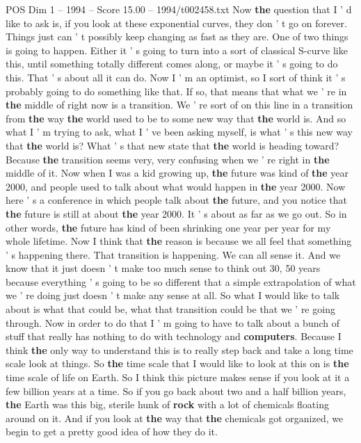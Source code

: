 \begin{textsample}{POS Dim 1 – 1994 – Score 15.00 – 1994/t002458.txt}
Now \textbf{the} question that I ' d like to ask is, if you look at these exponential curves, they don ' t go on forever.
Things just can ' t possibly keep changing as fast as they are.
One of two things is going to happen.
Either it ' s going to turn into a sort of classical S-curve like this, until something totally different comes along, or maybe it ' s going to do this.
That ' s about all it can do.
Now I ' m an optimist, so I sort of think it ' s probably going to do something like that.
If so, that means that what we ' re in \textbf{the} middle of right now is a transition.
We ' re sort of on this line in a transition from \textbf{the} way \textbf{the} world used to be to some new way that \textbf{the} world is.
And so what I ' m trying to ask, what I ' ve been asking myself, is what ' s this new way that \textbf{the} world is?
What ' s that new state that \textbf{the} world is heading toward?
Because \textbf{the} transition seems very, very confusing when we ' re right in \textbf{the} middle of it.
Now when I was a kid growing up, \textbf{the} future was kind of \textbf{the} year 2000, and people used to talk about what would happen in \textbf{the} year 2000.
Now here ' s a conference in which people talk about \textbf{the} future, and you notice that \textbf{the} future is still at about \textbf{the} year 2000.
It ' s about as far as we go out.
So in other words, \textbf{the} future has kind of been shrinking one year per year for my whole lifetime.
Now I think that \textbf{the} reason is because we all feel that something ' s happening there.
That transition is happening.
We can all sense it.
And we know that it just doesn ' t make too much sense to think out 30, 50 years because everything ' s going to be so different that a simple extrapolation of what we ' re doing just doesn ' t make any sense at all.
So what I would like to talk about is what that could be, what that transition could be that we ' re going through.
Now in order to do that I ' m going to have to talk about a bunch of stuff that really has nothing to do with technology and \textbf{computers}.
Because I think \textbf{the} only way to understand this is to really step back and take a long time scale look at things.
So \textbf{the} time scale that I would like to look at this on is \textbf{the} time scale of life on Earth.
So I think this picture makes sense if you look at it a few billion years at a time.
So if you go back about two and a half billion years, \textbf{the} Earth was this big, sterile hunk of \textbf{rock} with a lot of chemicals floating around on it.
And if you look at \textbf{the} way that \textbf{the} chemicals got organized, we begin to get a pretty good idea of how they do it.

\end{textsample}
